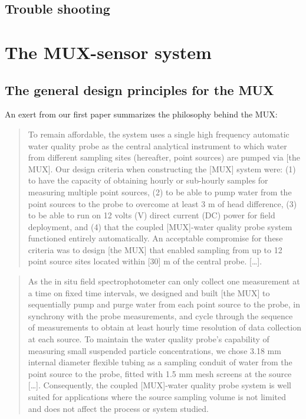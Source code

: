 \documentclass[]{book}
\begin{document}
\hypertarget{trouble-shooting}{%
\section{Trouble shooting}\label{trouble-shooting}}

\hypertarget{the-mux-sensor-system}{%
\chapter{The MUX-sensor system}\label{the-mux-sensor-system}}

\hypertarget{the-general-design-principles-for-the-mux}{%
\section{The general design principles for the MUX}\label{the-general-design-principles-for-the-mux}}

An exert from our first paper \citep{Birgand2016-to} summarizes the philosophy behind the MUX:

\begin{quote}
To remain affordable, the system uses a single high frequency automatic water quality probe as the central analytical
instrument to which water from different sampling sites (hereafter, point sources) are pumped via {[}the MUX{]}. Our design criteria when constructing the {[}MUX{]} system were: (1) to have the capacity of obtaining hourly or sub-hourly samples for measuring multiple point sources, (2) to be able to pump water from the point sources to the probe to overcome at least 3 m of head difference, (3) to be able to run on 12 volts (V) direct current (DC) power for field deployment, and (4) that the coupled {[}MUX{]}-water quality probe system functioned entirely automatically. An acceptable compromise for these criteria was to design {[}the MUX{]} that enabled sampling from up to 12 point source sites located within {[}30{]} m of the central probe. {[}\ldots{}{]}.
\end{quote}

\begin{quote}
As the in situ field spectrophotometer can only collect one measurement at a time on fixed time intervals, we designed and built {[}the MUX{]} to sequentially pump and purge water from each point source to the probe, in synchrony with the probe measurements, and cycle through the sequence of measurements to obtain at least hourly time resolution of data collection at each source. To maintain the water quality probe's capability of measuring small suspended particle concentrations, we chose 3.18 mm internal diameter flexible tubing as a sampling conduit of water from the point source to the probe, fitted with 1.5 mm mesh screens at the source {[}\ldots{}{]}. Consequently, the coupled {[}MUX{]}-water quality probe system is well suited for applications where the source sampling volume is not limited and does not affect the process or system studied.
\end{quote}
\end{document}

